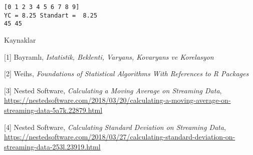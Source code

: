 \documentclass[12pt,fleqn]{article}\usepackage{../../common}
\begin{document}
\begin{verbatim}
[0 1 2 3 4 5 6 7 8 9]
YC = 8.25 Standart =  8.25
45 45
\end{verbatim}


Kaynaklar

[1] Bayramlı, {\em Istatistik, Beklenti, Varyans, Kovaryans ve Korelasyon}

[2] Weihs, {\em Foundations of Statistical Algorithms With References to R Packages}

[3] Nested Software, {\em Calculating a Moving Average on Streaming Data},
    \url{https://nestedsoftware.com/2018/03/20/calculating-a-moving-average-on-streaming-data-5a7k.22879.html}

[4] Nested Software, {\em Calculating Standard Deviation on Streaming Data},
    \url{https://nestedsoftware.com/2018/03/27/calculating-standard-deviation-on-streaming-data-253l.23919.html}
\end{document}
